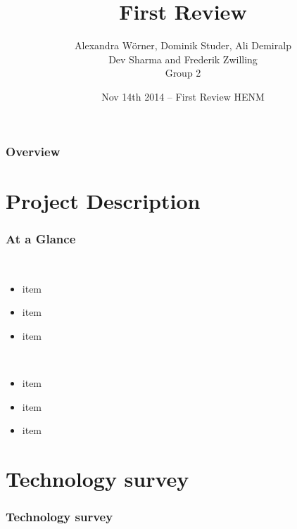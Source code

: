 

\title[Collaborative 3D Model Viewing on the Web]{First Review}
\author[Group 2 (3D Models)]{%
  Alexandra Wörner, Dominik Studer, Ali Demiralp\\ Dev Sharma and Frederik Zwilling \\
  \bigskip
  {\scriptsize Group 2}
}

\date[Nov 14th 2014 @ HENM 2014]{Nov 14th 2014 -- First Review HENM}



\frame[plain]{\titlepage}
\addtocounter{framenumber}{-1}

\begin{frame}
  \frametitle{Overview}
  \tableofcontents[hideallsubsections]
\end{frame}

\section{Project Description}

\begin{frame}
  \frametitle{At a Glance}

  \begin{description}[]
  \item[Why Collaborative 3D Model Viewing?] \hfill \\
    \begin{itemize}
    \item item
    \item item
    \item item
    \end{itemize}

    \bigskip
  \item[Our Approach] \hfill \\
    \begin{itemize}
    \item item
    \item item
    \item item
    \end{itemize}
  \end{description}
\end{frame}

\section{Technology survey}

\begin{frame}
  \frametitle{Technology survey}
\end{frame}


